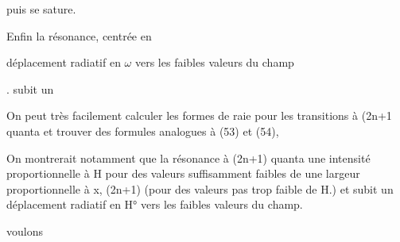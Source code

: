 puis se sature.

Enfin la résonance, centrée en 

déplacement radiatif en $\omega$ vers les faibles valeurs du champ

. subit un

On peut très facilement calculer les formes de raie pour les transitions à (2n+1 quanta et trouver des formules analogues à (53) et (54),

On montrerait notamment que la résonance à (2n+1) quanta  une intensité
proportionnelle à H pour des valeurs suffisamment faibles de  une
largeur proportionnelle à x, (2n+1) (pour des valeurs pas trop faible de H.)
et subit un déplacement radiatif en H° vers les faibles valeurs du champ.

voulons

